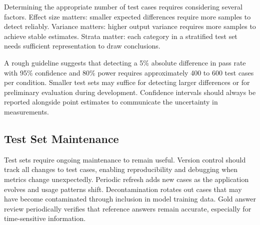 Determining the appropriate number of test cases requires considering several factors. Effect size matters: smaller expected differences require more samples to detect reliably. Variance matters: higher output variance requires more samples to achieve stable estimates. Strata matter: each category in a stratified test set needs sufficient representation to draw conclusions.

A rough guideline suggests that detecting a 5\% absolute difference in pass rate with 95\% confidence and 80\% power requires approximately 400 to 600 test cases per condition. Smaller test sets may suffice for detecting larger differences or for preliminary evaluation during development. Confidence intervals should always be reported alongside point estimates to communicate the uncertainty in measurements.

\subsection{Test Set Maintenance}

Test sets require ongoing maintenance to remain useful. Version control should track all changes to test cases, enabling reproducibility and debugging when metrics change unexpectedly. Periodic refresh adds new cases as the application evolves and usage patterns shift. Decontamination rotates out cases that may have become contaminated through inclusion in model training data. Gold answer review periodically verifies that reference answers remain accurate, especially for time-sensitive information.

